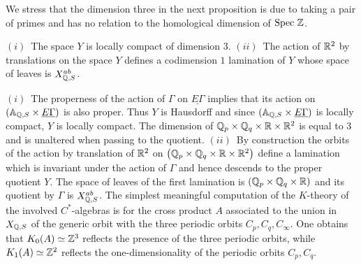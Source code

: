  We stress that the dimension three in the next proposition   is due to taking a pair of primes and has no relation to the homological dimension of ${\rm Spec\,}\,\mathbb{Z}$.
  \begin{prop}  	
 \label{bciso} $(i)$~The space $Y$ is locally compact of dimension $3$.\newline
  $(ii)$~The action of $\mathbb{R}^2$ by translations  on the   space $Y$ defines a codimension $1$  lamination of $Y$ whose space of leaves is $X_{{\mathbb Q},S}^{ab}$.
    \end{prop}
    \proof  $(i)$~The properness of the action of $\Gamma$ on $\underline{E \Gamma}$ implies  that its action on $\left({\mathbb A}_{{\mathbb Q},S}\times \underline{E \Gamma}\right) $ is also proper. Thus $Y$ is Hausdorff  and since $\left({\mathbb A}_{{\mathbb Q},S}\times \underline{E \Gamma}\right) $ is locally compact, $Y$ is  locally compact. The dimension of ${\mathbb Q}_p\times {\mathbb Q}_q\times \mathbb{R} \times \mathbb{R}^2$ is equal to $3$ and is unaltered when passing to the quotient.\newline
    $(ii)$~By construction the orbits of the action by translation of $\mathbb{R}^2$ on $\left({\mathbb Q}_p\times {\mathbb Q}_q\times \mathbb{R} \times \mathbb{R}^2\right)$ define a lamination which is invariant under the action of $\Gamma$ and hence descends to the proper quotient $Y$. The space of leaves of the first lamination is $\left({\mathbb Q}_p\times {\mathbb Q}_q\times \mathbb{R} \right)$ and its quotient by $\Gamma$ is $X_{{\mathbb Q},S}^{ab}$.\endproof 
     The simplest meaningful computation of the $K$-theory of the involved $C^*$-algebras  is for the cross product $A$ associated to the union in $X_{{\mathbb Q},S}$ of the generic orbit with the three periodic orbits $C_p,C_q,C_\infty$. One obtains that $K_0(A)\simeq \mathbb{Z}^3$ reflects the presence of the three periodic orbits, while $K_1(A)\simeq \mathbb{Z}^2$ reflects the one-dimensionality of the periodic orbits $C_p,C_q$.
